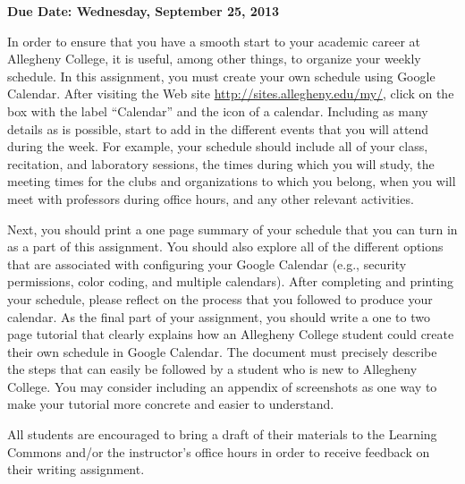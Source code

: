 

\usepackage[compact]{titlesec}



\vspace*{-.2in}
\begin{center}
	{\bf Due Date: Wednesday, September 25, 2013}
\end{center}

In order to ensure that you have a smooth start to your academic career at Allegheny College, it is useful, among other
things, to organize your weekly schedule. In this assignment, you must create your own schedule using Google Calendar.
After visiting the Web site \url{http://sites.allegheny.edu/my/}, click on the box with the label ``Calendar'' and the
icon of a calendar. Including as many details as is possible, start to add in the different events that you will attend
during the week. For example, your schedule should include all of your class, recitation, and laboratory sessions, the
times during which you will study, the meeting times for the clubs and organizations to which you belong, when you will
meet with professors during office hours, and any other relevant activities.

Next, you should print a one page summary of your schedule that you can turn in as a part of this assignment. You should
also explore all of the different options that are associated with configuring your Google Calendar (e.g., security
permissions, color coding, and multiple calendars). After completing and printing your schedule, please reflect on the
process that you followed to produce your calendar. As the final part of your assignment, you should write a one to two
page tutorial that clearly explains how an Allegheny College student could create their own schedule in Google Calendar.
The document must precisely describe the steps that can easily be followed by a student who is new to Allegheny
College. You may consider including an appendix of screenshots as one way to make your tutorial more concrete and easier
to understand.

All students are encouraged to bring a draft of their materials to the Learning Commons and/or the instructor's office
hours in order to receive feedback on their writing assignment.


